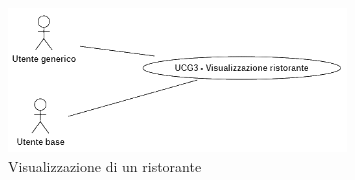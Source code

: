 \newpage
{}  
\label{usecase:Visualizzazione di un ristorante}

\begin{figure}[h]
	\centering
	\includegraphics[width=0.8\textwidth]{./uml/UCG3.png} 
	\caption{Visualizzazione di un ristorante}
	\label{fig:UCG3}
\end{figure}

